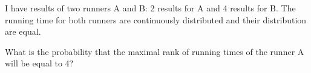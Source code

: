 
\begin{question}
I have results of two runners A and B: 2 results for A and 4 results
for B. The running time for both runners are continuously distributed and their distribution are equal.

What is the probability that the maximal rank of running times of the runner A will be equal to 4?
\end{question}


